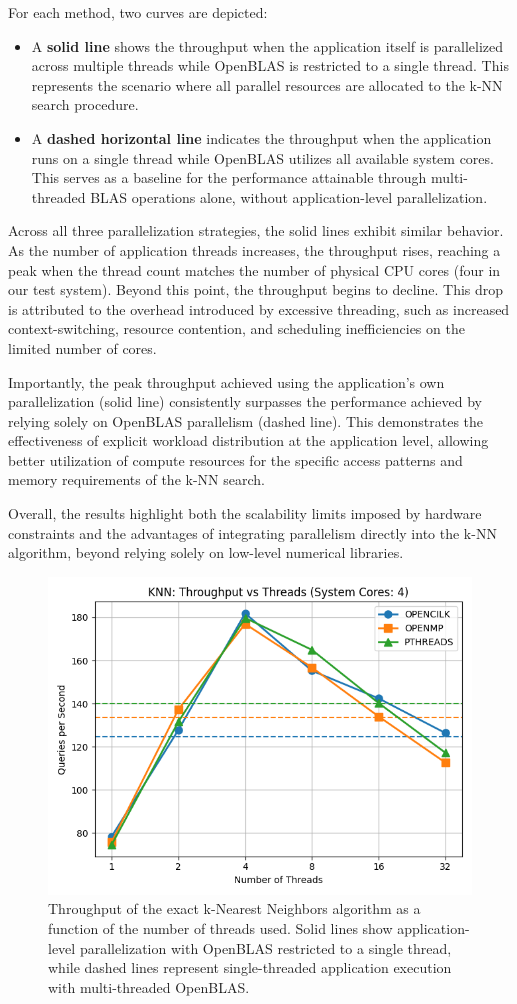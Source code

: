 \documentclass{article}
\begin{document}
For each method, two curves are depicted:
\begin{itemize}
\item A \textbf{solid line} shows the throughput when the application itself is parallelized across multiple
threads while OpenBLAS is restricted to a single thread. This represents the scenario where all parallel 
resources are allocated to the k-NN search procedure.
\item A \textbf{dashed horizontal line} indicates the throughput when the application runs on a single thread 
while OpenBLAS utilizes all available system cores. This serves as a baseline for the performance attainable 
through multi-threaded BLAS operations alone, without application-level parallelization.
\end{itemize}

Across all three parallelization strategies, the solid lines exhibit similar behavior. As the number of 
application threads increases, the throughput rises, reaching a peak when the thread count matches the 
number of physical CPU cores (four in our test system). Beyond this point, the throughput begins to decline. 
This drop is attributed to the overhead introduced by excessive threading, such as increased context-switching,
resource contention, and scheduling inefficiencies on the limited number of cores.

Importantly, the peak throughput achieved using the application’s own parallelization (solid line) consistently
surpasses the performance achieved by relying solely on OpenBLAS parallelism (dashed line). This demonstrates the
effectiveness of explicit workload distribution at the application level, allowing better utilization of compute 
resources for the specific access patterns and memory requirements of the k-NN search.

Overall, the results highlight both the scalability limits imposed by hardware constraints and the advantages 
of integrating parallelism directly into the k-NN algorithm, beyond relying solely on low-level numerical 
libraries.

\begin{figure}
    \centering
    \includegraphics[width=0.5\linewidth]{figures/knn_throughput_vs_threads.png}
    \caption{Throughput of the exact k-Nearest Neighbors algorithm as a function of the number of threads used. 
    Solid lines show application-level parallelization with OpenBLAS restricted to a single thread, while dashed
    lines represent single-threaded application execution with multi-threaded OpenBLAS.}
    \label{fig:knn_throughput_vs_threads}
\end{figure}
\end{document}
